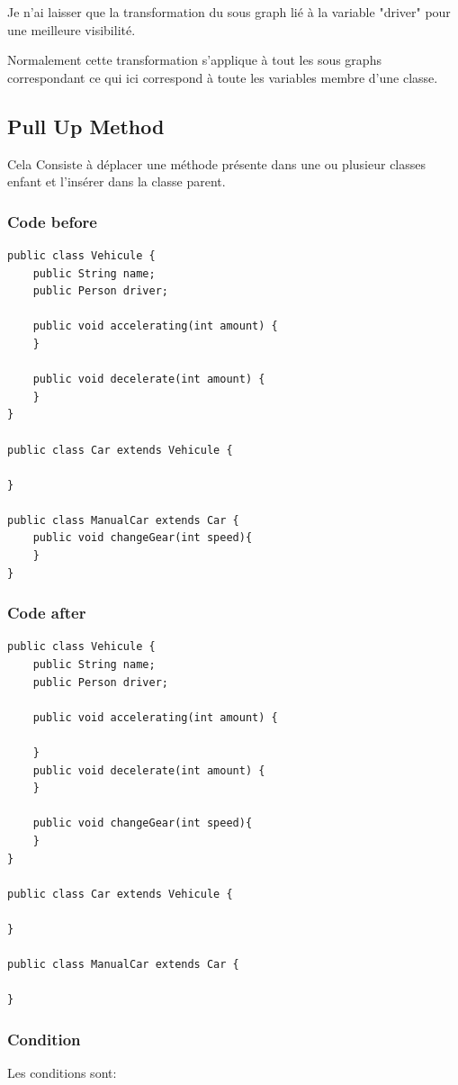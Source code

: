 \documentclass[a4paper, 10pt]{article}
\begin{document}
Je n'ai laisser que la transformation du sous graph lié à la variable "driver" pour une meilleure visibilité. 

Normalement cette transformation s'applique à tout les sous graphs correspondant ce qui ici correspond à toute les variables membre d'une classe.

\subsection{Pull Up Method}

Cela Consiste à déplacer une méthode présente dans une ou plusieur classes enfant et l'insérer dans la classe parent.

\subsubsection{Code before}
\begin{lstlisting}[frame=single]
public class Vehicule {
	public String name;
	public Person driver;

	public void accelerating(int amount) { 
	}

	public void decelerate(int amount) { 
	}
}

public class Car extends Vehicule {

}

public class ManualCar extends Car {
	public void changeGear(int speed){ 
	}
}
\end{lstlisting}

\subsubsection{Code after}
\begin{lstlisting}[frame=single]
public class Vehicule {
	public String name;
	public Person driver;

	public void accelerating(int amount) {

	}
	public void decelerate(int amount) { 
	}
	
	public void changeGear(int speed){
	}
}

public class Car extends Vehicule {

}

public class ManualCar extends Car {

}
\end{lstlisting}
\subsubsection{Condition}
Les conditions sont:
\end{document}
